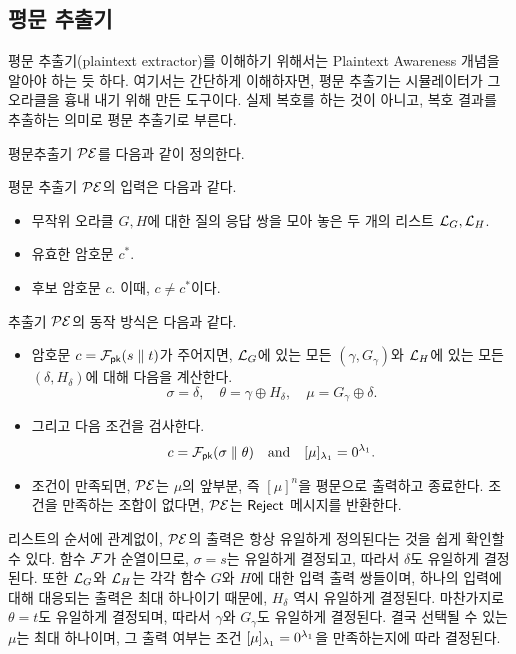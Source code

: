 \subsection{평문 추출기}

\begin{memo}
	평문 추출기(plaintext extractor)를 이해하기 위해서는 Plaintext Awareness
	개념을 알아야 하는 듯 하다. 여기서는 간단하게 이해하자면, 평문 추출기는
	시뮬레이터가 그 오라클을 흉내 내기 위해 만든 도구이다. 실제 복호를 하는 것이
	아니고, 복호 결과를 추출하는 의미로 평문 추출기로 부른다.
\end{memo}

평문추출기 $\mathcal{PE}$를 다음과 같이 정의한다.

\begin{tcolorbox}
	평문 추출기 $\mathcal{PE}$의 입력은 다음과 같다.
	\begin{itemize}
		\item 무작위 오라클 $G, H$에 대한 질의 응답 쌍을 모아 놓은 두 개의
		리스트 $\mathcal{L}_G, \mathcal{L}_H$.
		\item 유효한 암호문 $c^*$.
		\item 후보 암호문 $c$. 이때, $c \ne c^*$이다.
	\end{itemize}
	추출기 $\mathcal{PE}$의 동작 방식은 다음과 같다.
	\begin{itemize}
		\item 암호문 $c = \mathcal{F}_{\textsf{pk}}(s \parallel t)$가 주어지면, $\mathcal{L}_G$에 있는 모든
		$(\gamma, G_\gamma)$와 $\mathcal{L}_H$에 있는 모든 $(\delta, H_\delta)$에 대해
		다음을 계산한다. 
		$$
			\sigma = \delta, \quad 
			\theta = \gamma \oplus H_\delta, \quad 
			\mu = G_\gamma \oplus \delta.
		$$
		\item 그리고 다음 조건을 검사한다.
		$$
			c = \mathcal{F}_{\textsf{pk}}(\sigma \parallel \theta) \quad \text{and} \quad 
			[\mu]_{\lambda_1} = 0^{\lambda_1}.
		$$
		\item 조건이 만족되면, $\mathcal{PE}$는 $\mu$의 앞부분, 즉 $[\mu]^n$을 평문으로
		출력하고 종료한다. 조건을 만족하는 조합이 없다면, $\mathcal{PE}$는 $\textsf{Reject}$
		메시지를 반환한다.
	\end{itemize}
\end{tcolorbox}


리스트의 순서에 관계없이, $\mathcal{PE}$의 출력은 항상 유일하게 정의된다는 것을 쉽게
확인할 수 있다. 함수 $\mathcal{F}$가 순열이므로, $\sigma = s$는 유일하게 결정되고, 따라서
$\delta$도 유일하게 결정된다. 또한 $\mathcal{L}_G$와 $\mathcal{L}_H$는 각각 함수 $G$와 $H$에
대한 입력 출력 쌍들이며, 하나의 입력에 대해 대응되는 출력은 최대 하나이기
때문에, $H_\delta$ 역시 유일하게 결정된다. 마찬가지로 $\theta = t$도 유일하게
결정되며, 따라서 $\gamma$와 $G_\gamma$도 유일하게 결정된다. 결국 선택될 수 있는
$\mu$는 최대 하나이며, 그 출력 여부는 조건 $[\mu]_{\lambda_1} = 0^{\lambda_1}$을
만족하는지에 따라 결정된다.

